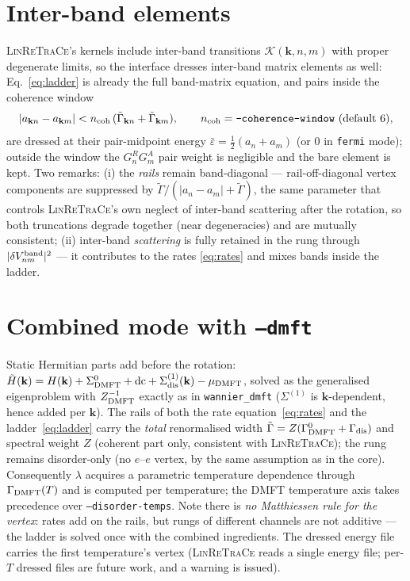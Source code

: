 \documentclass[11pt]{article}
\newcommand{\vk}{\mathbf{k}}
\newcommand{\eps}{\varepsilon}
\newcommand{\Gam}{\Gamma}
\begin{document}
\section{Inter-band elements}
\label{sec:interband}
\textsc{LinReTraCe}'s kernels include inter-band transitions
$\mathcal K(\vk,n,m)$ with proper degenerate limits, so the interface
dresses inter-band matrix elements as well: Eq.~\eqref{eq:ladder} is
already the full band-matrix equation, and pairs inside the coherence
window
\begin{equation}
|a_{\vk n}-a_{\vk m}|<n_{\rm coh}\,
(\tilde\Gam_{\vk n}+\tilde\Gam_{\vk m}),
\qquad n_{\rm coh}=\texttt{--coherence-window}\ (\text{default }6),
\end{equation}
are dressed at their pair-midpoint energy
$\bar\eps=\tfrac12(a_n+a_m)$ (or $0$ in \texttt{fermi} mode); outside
the window the $G^R_nG^A_m$ pair weight is negligible and the bare
element is kept.  Two remarks: (i) the \emph{rails} remain
band-diagonal --- rail-off-diagonal vertex components are suppressed by
$\tilde\Gam/(|a_n-a_m|+\tilde\Gam)$, the same parameter that controls
\textsc{LinReTraCe}'s own neglect of inter-band scattering after the
rotation, so both truncations degrade together (near degeneracies) and
are mutually consistent; (ii) inter-band \emph{scattering} is fully
retained in the rung through $|\delta V^{\rm band}_{nm}|^2$ --- it
contributes to the rates \eqref{eq:rates} and mixes bands inside the
ladder.

\section{Combined mode with \texttt{--dmft}}
\label{sec:dmft}
Static Hermitian parts add before the rotation:
$\tilde H(\vk)=H(\vk)+\Sigma^0_{\rm DMFT}+\mathrm{dc}
+\Sigma^{(1)}_{\rm dis}(\vk)-\mu_{\rm DMFT}$, solved as the generalised
eigenproblem with $Z^{-1}_{\rm DMFT}$ exactly as in
\texttt{wannier\_dmft} ($\Sigma^{(1)}$ is $\vk$-dependent, hence added
per $\vk$).  The rails of both the rate equation~\eqref{eq:rates} and
the ladder~\eqref{eq:ladder} carry the \emph{total} renormalised width
$\tilde\Gam=Z(\Gam^0_{\rm DMFT}+\Gam_{\rm dis})$ and spectral weight
$Z$ (coherent part only, consistent with \textsc{LinReTraCe}); the rung
remains disorder-only (no $e$--$e$ vertex, by the same assumption as in
the core).  Consequently $\lambda$ acquires a parametric temperature
dependence through $\Gam_{\rm DMFT}(T)$ and is computed per
temperature; the DMFT temperature axis takes precedence over
\texttt{--disorder-temps}.  Note there is \emph{no Matthiessen rule for
the vertex}: rates add on the rails, but rungs of different channels
are not additive --- the ladder is solved once with the combined
ingredients.  The dressed energy file carries the first temperature's
vertex (\textsc{LinReTraCe} reads a single energy file; per-$T$ dressed
files are future work, and a warning is issued).
\end{document}
